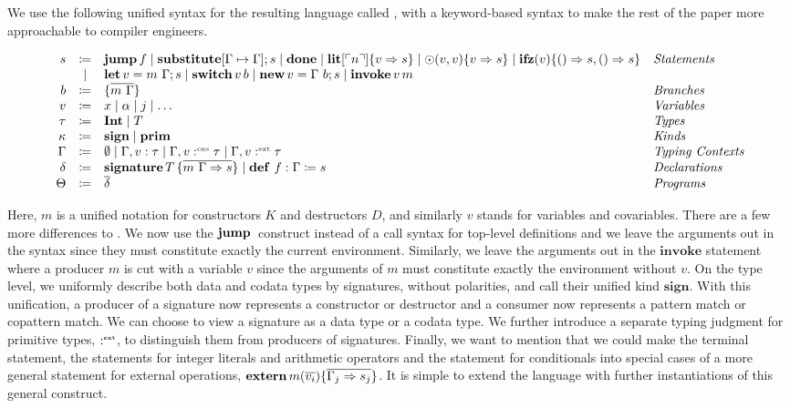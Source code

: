We use the following unified syntax for the resulting language called \machinelang, with a keyword-based syntax to make the rest of the paper more approachable to compiler engineers.

\begin{definition}
    \[ 
      \begin{array}{r c l l}
        s & \coloneqq & \mathbf{jump}\, f \mid \mathbf{substitute}[\Gamma \mapsto \Gamma]; s \mid \mathbf{done} \mid \mathbf{lit}[\ulcorner n \urcorner]\{ v \Rightarrow s \} \mid \odot(v, v)\{ v \Rightarrow s \} \mid \mathbf{ifz}(v)\{ () \Rightarrow s, () \Rightarrow s \} & \emph{Statements}\\
        & \mid & \mathbf{let}\, v = m\ \Gamma; s \mid \mathbf{switch}\, v\, b \mid \mathbf{new}\, v = \Gamma\ b; s \mid \mathbf{invoke}\, v\, m & \\
        b & \coloneqq & \{ \overline{m\ \Gamma} \} & \emph{Branches}\\
        v & \coloneqq & x \mid \alpha \mid j \mid \ldots & \emph{Variables}\\
        \tau & \coloneqq & \mathbf{Int} \mid T & \emph{Types}\\
        \kappa & \coloneqq & \mathbf{sign} \mid \mathbf{prim} & \emph{Kinds}\\
        \Gamma & \coloneqq & \emptyset \mid \Gamma, v : \tau \mid \Gamma, v :^{\text{\tiny cns}} \tau \mid \Gamma, v :^{\text{\tiny ext}} \tau & \emph{Typing Contexts} \\
        \delta & \coloneqq & \mathbf{signature}\, T\, \{ \overline{m\ \Gamma \Rightarrow s} \} \mid \mathbf{def}\ f : \Gamma \coloneq s & \emph{Declarations}\\
        \Theta & \coloneqq & \overline{\delta} & \emph{Programs}\\
      \end{array}
    \]
\end{definition}

Here, $m$ is a unified notation for constructors $K$ and destructors $D$, and similarly $v$ stands for variables and covariables.
There are a few more differences to \targetsub.
We now use the $\mathbf{jump}\, $ construct instead of a call syntax for top-level definitions and we leave the arguments out in the syntax since they must constitute exactly the current environment.
Similarly, we leave the arguments out in the $\mathbf{invoke}$ statement where a producer $m$ is cut with a variable $v$ since the arguments of $m$ must constitute exactly the environment without $v$.
On the type level, we uniformly describe both data and codata types by signatures, without polarities, and call their unified kind $\mathbf{sign}$.
With this unification, a producer of a signature now represents a constructor or destructor and a consumer now represents a pattern match or copattern match.
We can choose to view a signature as a data type or a codata type.
We further introduce a separate typing judgment for primitive types, $:^{\text{\tiny ext}}$, to distinguish them from producers of signatures.
Finally, we want to mention that we could make the terminal statement, the statements for integer literals and arithmetic operators and the statement for conditionals into special cases of a more general statement for external operations, $\mathbf{extern}\, m(\overline{v_i})\{ \overline{\Gamma_j \Rightarrow s_j} \}$.
It is simple to extend the language with further instantiations of this general construct.

